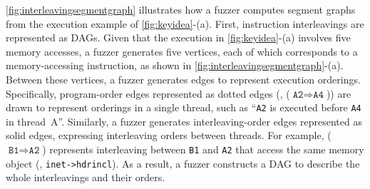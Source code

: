 %



%
%
\autoref{fig:interleavingsegmentgraph} illustrates how a fuzzer 
computes segment graphs from the execution example of
\autoref{fig:keyidea}-(a).
%
First, instruction interleavings are represented as DAGs.
Given that the execution in \autoref{fig:keyidea}-(a) involves 
five memory accesses, a fuzzer generates five vertices, 
each of which corresponds to a memory-accessing instruction, 
as shown in \autoref{fig:interleavingsegmentgraph}-(a).
%
Between these vertices, a fuzzer generates edges to represent
execution orderings. Specifically, program-order edges represented as
dotted edges (\eg, ($\texttt{A2} \Rightarrow \texttt{A4}$)) are drawn
to represent orderings in a single thread, such as
``\texttt{A2} is executed before \texttt{A4} in thread~A''.
%
Similarly, a fuzzer generates interleaving-order edges represented as
solid edges, expressing interleaving orders between threads. For
example, ($\texttt{B1} \Rightarrow \texttt{A2}$) represents
interleaving between \texttt{B1} and \texttt{A2} that access the same
memory object (\ie, \texttt{inet->hdrincl}).
%
As a result, a fuzzer constructs a DAG to describe the whole
interleavings and their orders.

